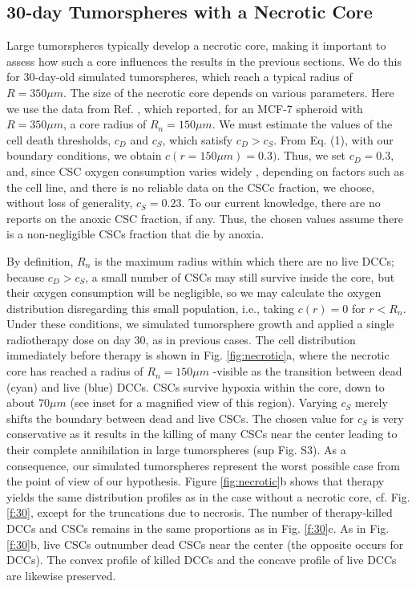\documentclass[10pt,letterpaper]{article}
\begin{document}

\subsection*{30-day Tumorspheres with a Necrotic Core}


Large tumorspheres typically develop a necrotic core, making it important to assess how such a core influences the results in the previous sections. We do this for 30-day-old simulated tumorspheres, which reach a typical radius of $R=350 \mu m$. The size of the necrotic core depends on various parameters. Here we use the data from Ref. \cite{mukomoto2020}, which reported, for an MCF-7 spheroid with $R=350 \mu m$, a core radius of $R_n=150 \mu m$. We must estimate the values of the cell death thresholds, $c_D$ and $c_S$, which satisfy $c_D > c_S $. From Eq. (1), with our boundary conditions, we obtain $c(r=150 \mu m) = 0.3)$. Thus, we set $c_D = 0.3$, and, since CSC oxygen consumption varies widely \cite{lee2016tumorsphere}, depending on factors such as the cell line, and there is no reliable data on the CSCc fraction, we choose, without loss of generality, $c_S=0.23$. To our current knowledge, there are no reports on the anoxic CSC fraction, if any.  Thus, the chosen values assume there is a non-negligible CSCs fraction that die by anoxia. 

By definition, $R_n$ is the maximum radius within which there are no live DCCs; because $c_D > c_S$, a small number of CSCs may still survive inside the core, but their oxygen consumption will be negligible, so we may calculate the oxygen distribution disregarding this small population, i.e., taking $c(r)=0$ for $r<R_n$.  Under these conditions, we simulated tumorsphere growth and applied a single radiotherapy dose on day 30, as in previous cases. The cell distribution immediately before therapy is shown in Fig. \ref{fig:necrotic}a, where the necrotic core has reached a radius of $R_n = 150 \mu m$ -visible as the transition between dead (cyan) and live (blue) DCCs. CSCs survive hypoxia within the core, down to about $70 \mu m$ (see inset for a magnified view of this region). Varying $c_S$ merely shifts the boundary between dead and live CSCs. The chosen value for $c_S$ is very conservative as it results in the killing of many CSCs near the center leading to their complete annihilation in large tumorspheres (sup Fig. S3). As a consequence, our simulated tumorspheres represent the worst possible case from the point of view of our hypothesis. Figure \ref{fig:necrotic}b shows that therapy yields the same distribution profiles as in the case without a necrotic core, cf. Fig. \ref{f:30}, except for the truncations due to necrosis. The number of therapy-killed DCCs and CSCs remains in the same proportions as in Fig. \ref{f:30}c. As in Fig. \ref{f:30}b, live CSCs outnumber dead CSCs near the center (the opposite occurs for DCCs). The convex profile of killed DCCs and the concave profile of live DCCs are likewise preserved.
\end{document}
